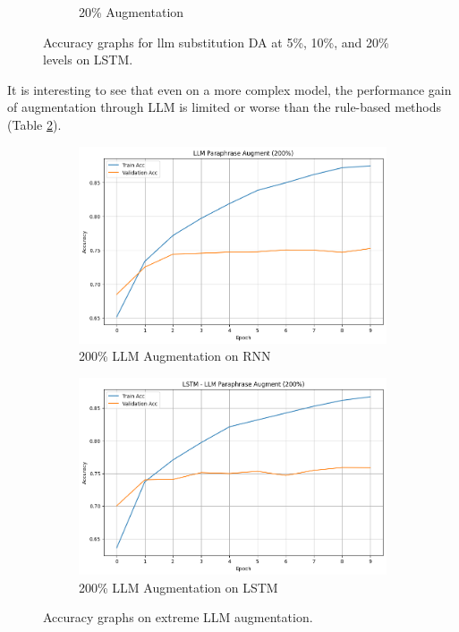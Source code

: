 \documentclass[10pt]{extarticle}
\begin{document}
\begin{figure}[ht]
\begin{subfigure}[b]{0.3\textwidth}
    \caption{20\% Augmentation}
    \label{fig:llm_20_lstm}
  \end{subfigure}
  \caption{Accuracy graphs for llm substitution DA at 5\%, 10\%, and 20\% levels on LSTM.}
  \label{fig:llm_lstm_substitution_accuracy}
\end{figure}

It is interesting to see that even on a more complex model, the performance
gain of augmentation through LLM is limited or worse than the rule-based
methods (Table \ref{fig:llm_lstm_substitution_accuracy}).

\begin{figure}[ht]
  \centering
  \begin{subfigure}[b]{0.45\textwidth}
    \includegraphics[width=\textwidth]{img/llm_200_rnn.png}
    \caption{200\% LLM Augmentation on RNN}
    \label{fig:llm_200_rnn}
  \end{subfigure}
  \hfill
  \begin{subfigure}[b]{0.45\textwidth}
    \includegraphics[width=\textwidth]{img/llm_200_lstm.png}
    \caption{200\% LLM Augmentation on LSTM}
    \label{fig:llm_200_lstm}
  \end{subfigure}
  \caption{Accuracy graphs on extreme LLM augmentation.}
  \label{fig:llm_extreme_substitution_acc}
\end{figure}
\end{document}
